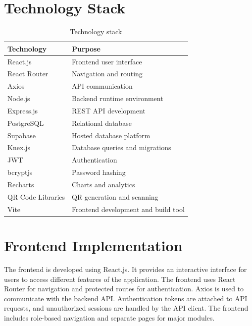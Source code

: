 \documentclass[11pt,a4paper]{article}
\newcommand{\hrow}{\rowcolor{gray!14}}
\newcommand{\tablestyle}{\centering\small\renewcommand{\arraystretch}{1.3}}
\begin{document}
\section{Technology Stack}
\begin{table}[H]
\tablestyle
\begin{tabularx}{\linewidth}{>{\raggedright\arraybackslash}p{4.2cm}Y}
\toprule
\hrow\textbf{Technology} & \textbf{Purpose}\\
\midrule
React.js & Frontend user interface\\
React Router & Navigation and routing\\
Axios & API communication\\
Node.js & Backend runtime environment\\
Express.js & REST API development\\
PostgreSQL & Relational database\\
Supabase & Hosted database platform\\
Knex.js & Database queries and migrations\\
JWT & Authentication\\
bcryptjs & Password hashing\\
Recharts & Charts and analytics\\
QR Code Libraries & QR generation and scanning\\
Vite & Frontend development and build tool\\
\bottomrule
\end{tabularx}
\caption{Technology stack}
\end{table}

\section{Frontend Implementation}
The frontend is developed using React.js. It provides an interactive interface for users to access different features of the application. The frontend uses React Router for navigation and protected routes for authentication. Axios is used to communicate with the backend API. Authentication tokens are attached to API requests, and unauthorized sessions are handled by the API client. The frontend includes role-based navigation and separate pages for major modules.
\end{document}
